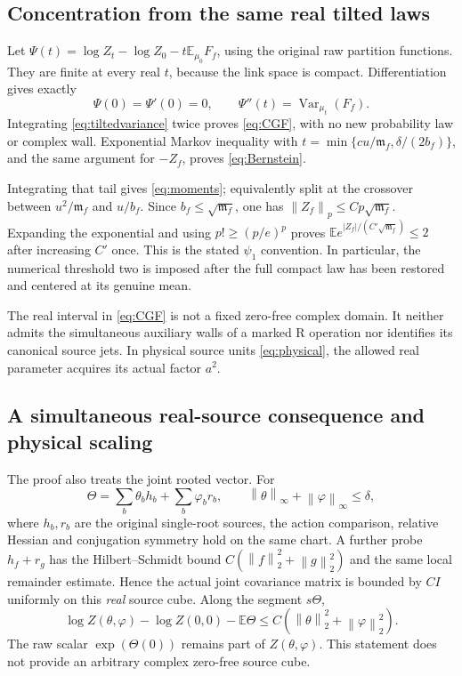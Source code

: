 \documentclass[11pt,letterpaper]{article}
\numberwithin{equation}{section}
\theoremstyle{definition}\newtheorem{definition}[theorem]{Definition}
\theoremstyle{remark}\newtheorem{remark}[theorem]{Remark}
\newcommand{\E}{\mathbb E}\newcommand{\Var}{\operatorname{Var}}
\newcommand{\mf}{\mathfrak m_f}\newcommand{\eps}{\varepsilon}
\newcommand{\norm}[1]{\left\lVert #1\right\rVert}
\begin{document}
\subsection{Concentration from the same real tilted laws}

Let $\Psi(t)=\log Z_t-\log Z_0-t\E_{\mu_0}F_f$, using the original raw partition functions. They are finite at every real $t$, because the link space is compact. Differentiation gives exactly
\[
 \Psi(0)=\Psi'(0)=0,\qquad \Psi''(t)=\Var_{\mu_t}(F_f).
\]
Integrating \eqref{eq:tiltedvariance} twice proves \eqref{eq:CGF}, with no new probability law or complex wall. Exponential Markov inequality with
$t=\min\{c u/\mf,\delta/(2b_f)\}$, and the same argument for $-Z_f$, proves \eqref{eq:Bernstein}.

Integrating that tail gives \eqref{eq:moments}; equivalently split at the crossover between $u^2/\mf$ and $u/b_f$. Since $b_f\le\sqrt{\mf}$, one has $\norm{Z_f}_p\le Cp\sqrt{\mf}$. Expanding the exponential and using $p!\ge(p/e)^p$ proves $\E e^{|Z_f|/(C'\sqrt{\mf})}\le2$ after increasing $C'$ once. This is the stated $\psi_1$ convention. In particular, the numerical threshold two is imposed after the full compact law has been restored and centered at its genuine mean.

The real interval in \eqref{eq:CGF} is not a fixed zero-free complex domain. It neither admits the simultaneous auxiliary walls of a marked R operation nor identifies its canonical source jets. In physical source units \eqref{eq:physical}, the allowed real parameter acquires its actual factor $a^2$.

\subsection{A simultaneous real-source consequence and physical scaling}

The proof also treats the joint rooted vector. For
\[
 \Theta=\sum_b\theta_bh_b+\sum_b\varphi_br_b,
 \qquad \norm\theta_\infty+\norm\varphi_\infty\le\delta,
\]
where $h_b,r_b$ are the original single-root sources, the action comparison, relative Hessian and conjugation symmetry hold on the same chart. A further probe $h_f+r_g$ has the Hilbert--Schmidt bound $C(\norm f_2^2+\norm g_2^2)$ and the same local remainder estimate. Hence the actual joint covariance matrix is bounded by $CI$ uniformly on this \emph{real} source cube. Along the segment $s\Theta$,
\[
 \log Z(\theta,\varphi)-\log Z(0,0)-\E\Theta
 \le C(\norm\theta_2^2+\norm\varphi_2^2).
\]
The raw scalar $\exp(\Theta(0))$ remains part of $Z(\theta,\varphi)$. This statement does not provide an arbitrary complex zero-free source cube.
\end{document}

